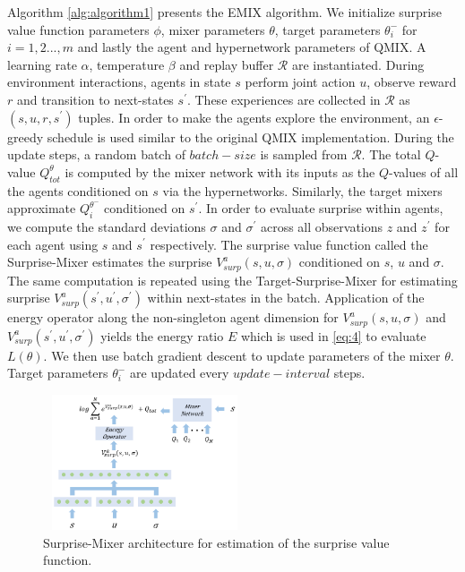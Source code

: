 \documentclass{article}
\begin{document}
\begin{multicols}{2}
Algorithm \autoref{alg:algorithm1} presents the EMIX algorithm. We initialize surprise value function parameters $\phi$, mixer parameters $\theta$, target parameters $\theta_{i}^{-}$ for $i=1,2...,m$ and lastly the agent and hypernetwork parameters of QMIX. A learning rate $\alpha$, temperature $\beta$ and replay buffer $\mathcal{R}$ are instantiated. During environment interactions, agents in state $s$ perform joint action $u$, observe reward $r$ and transition to next-states $s^{'}$. These experiences are collected in $\mathcal{R}$ as $(s,u,r,s^{'})$ tuples. In order to make the agents explore the environment, an $\epsilon$-greedy schedule is used similar to the original QMIX \cite{qmix} implementation. During the update steps, a random batch of $batch-size$ is sampled from $\mathcal{R}$. The total $Q$-value $Q_{tot}^{\theta}$ is computed by the mixer network with its inputs as the $Q$-values of all the agents conditioned on $s$ via the hypernetworks. Similarly, the target mixers approximate $Q_{i}^{\theta^{-}}$ conditioned on $s^{'}$. In order to evaluate surprise within agents, we compute the standard deviations $\sigma$ and $\sigma^{'}$ across all observations $z$ and $z^{'}$ for each agent using $s$ and $s^{'}$ respectively. The surprise value function called the Surprise-Mixer estimates the surprise $V^{a}_{surp}(s,u,\sigma)$ conditioned on $s$, $u$ and $\sigma$. The same computation is repeated using the Target-Surprise-Mixer for estimating surprise $V^{a}_{surp}(s^{'},u^{'},\sigma^{'})$  within next-states in the batch. Application of the energy operator along the non-singleton agent dimension for $V^{a}_{surp}(s,u,\sigma)$ and $V^{a}_{surp}(s^{'},u^{'},\sigma^{'})$ yields the energy ratio $E$ which is used in \autoref{eq:4} to evaluate $L(\theta)$. We then use batch gradient descent to update parameters of the mixer $\theta$. Target parameters $\theta_{i}^{-}$ are updated every $update-interval$ steps.
\begin{figure}
    \centering
    \includegraphics[height=4cm,width=6cm]{emix.PNG}
    \caption{Surprise-Mixer architecture for estimation of the surprise value function.}
    \label{fig:emix}

\end{figure}
\end{multicols}
\end{document}
